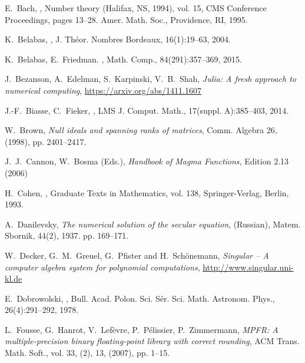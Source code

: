 \documentclass{sig-alternate-05-2015}
\begin{document}
{\footnotesize
\begin{thebibliographyy}{99}

E.~Bach,
,
\newblock Number theory ({H}alifax, {NS}, 1994), vol. 15, CMS
  Conference Proceedings, pages 13--28. Amer. Math. Soc., Providence, RI, 1995.

K.~Belabas,
,
\newblock J. Th\'eor. Nombres Bordeaux, 16(1):19--63, 2004.

K.~Belabas, E.~Friedman.
,
\newblock Math. Comp., 84(291):357--369, 2015.

J.~Bezanson, A.~Edelman, S.~Karpinski, V.~B.~Shah, {\em Julia: A fresh approach to numerical computing}, \url{https://arxiv.org/abs/1411.1607}

J.-F.~Biasse, C.~Fieker,
,
\newblock LMS J. Comput. Math., 17(suppl. A):385--403, 2014.

W.~Brown, {\em Null ideals and spanning ranks of matrices}, Comm. Algebra 26, (1998), pp. 2401--2417.

J.~J.~Cannon, W.~Bosma (Eds.), {\em Handbook of Magma Functions}, Edition 2.13 (2006)

H.~Cohen,
,
  Graduate Texts in Mathematics, vol. 138,
\newblock Springer-Verlag, Berlin, 1993.

A.~Danilevsky, {\em The numerical solution of the secular equation}, (Russian),
Matem. Sbornik, 44(2), 1937. pp. 169--171.

W.~Decker, G.~M.~Greuel, G.~Pfister and H.~Sch\"onemann, {\em Singular -- A computer algebra system for polynomial computations}, \url{http://www.singular.uni-kl.de}

E.~Dobrowolski,
,
\newblock Bull. Acad. Polon. Sci. S\'er. Sci. Math. Astronom. Phys.,
  26(4):291--292, 1978.

L.~Fousse, G.~Hanrot, V.~Lef\`{e}vre, P.~P\'{e}lissier, P.~Zimmermann, {\em MPFR: A multiple-precision
binary floating-point library with correct rounding}, ACM Trans. Math. Soft., vol. 33, (2), 13, (2007), pp. 1--15.


\end{thebibliographyy}}
\end{document}
